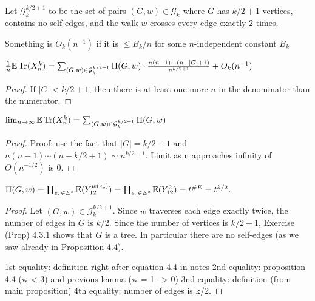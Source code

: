\begin{definition}
  \label{def:special_set_g}
  \notready
  Let $\mathcal{G}^{k/2+1}_k$ to be the set of pairs $(G,w)\in\mathcal{G}_k$ where $G$ has $k/2+1$ vertices, contains no self-edges, and the walk $w$ crosses every edge exactly $2$ times.
\end{definition}


\begin{definition}
  \label{def:big_o_with_base}
  \notready
  Something is $O_k(n^{-1})$ if it is $\le B_k/n$ for some $n$-independent constant $B_k$
\end{definition}

\begin{proposition}%
  \label{prop:eqn_trace_sum}
  \notready
  $\frac1n{\mathbb{E}}\operatorname{Tr}(X_n^k) = \sum_{(G,w)\in\mathcal{G}^{k/2+1}_k} \Pi(G,w) \cdot \frac{n(n-1)\cdots(n-|G|+1)}{n^{k/2+1}} + O_k(n^{-1})$
\end{proposition}

\begin{proof}
  \notready
  If $|G| < k/2 + 1$, then there is at least one more $n$ in the denominator than the numerator.
\end{proof}




\begin{proposition}%
  \label{prop:eqn_4_7_5}
  \notready
  $\lim_{n\to\infty}{\mathbb{E}}\operatorname{Tr}(X_n^k) = \sum_{(G,w)\in\mathcal{G}^{k/2+1}_k} \Pi(G,w)$
\end{proposition}

\begin{proof}
  \notready
  Proof: use the fact that $|G|=k/2+1$ and $n(n-1)\cdots(n-k/2+1) \sim n^{k/2+1}$. Limit as n approaches infinity of $O(n^{-1/2})$ is 0.
\end{proof}




\begin{proposition}
  \label{prop:eqn_4_8}
  \notready
  $\Pi(G,w) = \prod_{e_c\in E^c} {\mathbb{E}}(Y_{12}^{w(e_c)}) = \prod_{e_c\in E^c} {\mathbb{E}}(Y_{12}^2) = t^{\#E} = t^{k/2}$.
\end{proposition}

\begin{proof}
  \notready
  Let $(G,w)\in\mathcal{G}^{k/2+1}_k$.  Since $w$ traverses each edge exactly twice, the number of edges in $G$ is $k/2$.  Since the number of vertices is $k/2+1$, Exercise (Prop) 4.3.1 shows that $G$ is a tree.  In particular there are no self-edges (as we saw already in Proposition 4.4).

  1st equality: definition right after equation 4.4 in notes
  2nd equality: proposition 4.4 (w < 3) and previous lemma (w = 1 --> 0)
  3nd equality: definition (from main proposition)
  4th equality: number of edges is k/2.
\end{proof}





